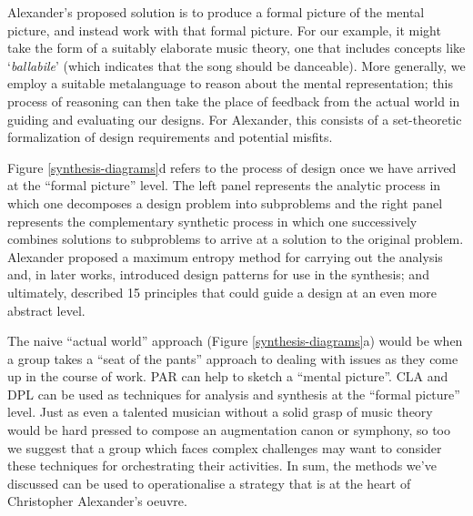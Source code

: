 \documentclass[acmlarge,timestamp]{acmart}
\begin{document}
Alexander’s proposed solution is to produce a formal picture of the
mental picture, and instead work with that formal picture.  For our
example, it might take the form of a suitably elaborate music theory,
one that includes concepts like ‘\emph{ballabile}’ (which indicates
that the song should be danceable).  More generally, we employ a
suitable metalanguage to reason about the mental representation; this
process of reasoning can then take the place of feedback from the
actual world in guiding and evaluating our designs.  For Alexander,
this consists of a set-theoretic formalization of design requirements
and potential misfits.


Figure \ref{synthesis-diagrams}d refers to the process of design once
we have arrived at the ``formal picture'' level.  The left panel
represents the analytic process in which one decomposes a design
problem into subproblems and the right panel represents the
complementary synthetic process in which one successively combines
solutions to subproblems to arrive at a solution to the original
problem.  Alexander proposed a maximum entropy method for carrying out
the analysis and, in later works, introduced design patterns for use
in the synthesis; and ultimately, described 15 principles that could
guide a design at an even more abstract level.

The naive ``actual world'' approach (Figure \ref{synthesis-diagrams}a)
would be when a group takes a ``seat of the pants'' approach to
dealing with issues as they come up in the course of work.  PAR can
help to sketch a ``mental picture''.  CLA and DPL can be used as
techniques for analysis and synthesis at the ``formal picture'' level.
 Just as even a talented
musician without a solid grasp of music theory would be hard pressed
to compose an augmentation canon or symphony, so too we suggest that a
group which faces complex challenges may want to consider these
techniques for orchestrating their activities.  In sum, the methods
we’ve discussed can be used to operationalise a strategy that is at
the heart of Christopher Alexander’s oeuvre.
\end{document}
